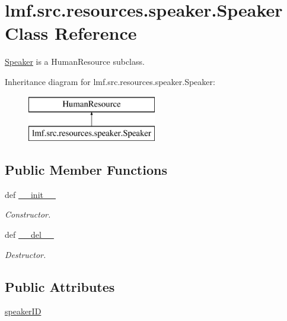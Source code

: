 \hypertarget{classlmf_1_1src_1_1resources_1_1speaker_1_1_speaker}{\section{lmf.\+src.\+resources.\+speaker.\+Speaker Class Reference}
\label{classlmf_1_1src_1_1resources_1_1speaker_1_1_speaker}
}


\hyperlink{classlmf_1_1src_1_1resources_1_1speaker_1_1_speaker}{Speaker} is a Human\+Resource subclass.  


Inheritance diagram for lmf.\+src.\+resources.\+speaker.\+Speaker\+:\begin{figure}[H]
\begin{center}
\leavevmode
\includegraphics[height=2.000000cm]{classlmf_1_1src_1_1resources_1_1speaker_1_1_speaker}
\end{center}
\end{figure}
\subsection*{Public Member Functions}
\begin{DoxyCompactItemize}
\item 
def \hyperlink{classlmf_1_1src_1_1resources_1_1speaker_1_1_speaker_a73f8f0a5217cbef69ff7312842f70491}{\+\_\+\+\_\+init\+\_\+\+\_\+}
\begin{DoxyCompactList}\small\item\em Constructor. \end{DoxyCompactList}\item 
def \hyperlink{classlmf_1_1src_1_1resources_1_1speaker_1_1_speaker_a632d48e2ba734a90ad64b263f0f4e058}{\+\_\+\+\_\+del\+\_\+\+\_\+}
\begin{DoxyCompactList}\small\item\em Destructor. \end{DoxyCompactList}\end{DoxyCompactItemize}
\subsection*{Public Attributes}
\begin{DoxyCompactItemize}
\item 
\hyperlink{classlmf_1_1src_1_1resources_1_1speaker_1_1_speaker_a2773f1341512df6b9c9c5fb0f5c34cf5}{speaker\+I\+D}
\end{DoxyCompactItemize}


